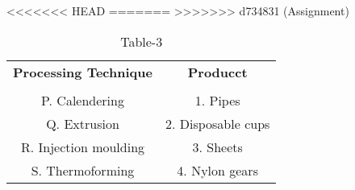 \begin{table}[htbp]
  \centering
  \caption{Table-3}
<<<<<<< HEAD
  \label{tab:tables/table3.tex}
=======
  \label{table3}
>>>>>>> d734831 (Assignment)
  \begin{tabular}{cc}
  \textbf{Processing Technique} & \textbf{Producct} \\ \\
    P. Calendering & 1. Pipes \\
    Q. Extrusion & 2. Disposable cups \\
    R. Injection moulding & 3. Sheets \\
    S. Thermoforming & 4. Nylon gears \\
  \end{tabular}
\end{table}